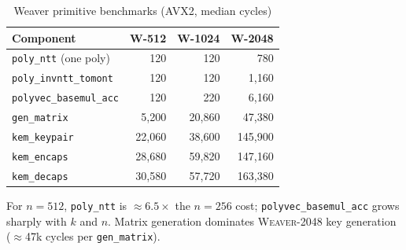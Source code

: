 \begin{table}[t]
\centering
\caption{Weaver primitive benchmarks (AVX2, median cycles)}
\label{tab:weaver_components}
\begin{tabular}{lrrr}
\toprule
\textbf{Component} & \textbf{W-512} & \textbf{W-1024} & \textbf{W-2048} \\
\midrule
\texttt{poly\_ntt} (one poly)       & 120   & 120   & 780 \\
\texttt{poly\_invntt\_tomont}       & 120   & 120   & 1{,}160 \\
\texttt{polyvec\_basemul\_acc}     & 120   & 220   & 6{,}160 \\
\texttt{gen\_matrix}               & 5{,}200 & 20{,}860 & 47{,}380 \\
\texttt{kem\_keypair}              & 22{,}060 & 38{,}600 & 145{,}900 \\
\texttt{kem\_encaps}               & 28{,}680 & 59{,}820 & 147{,}160 \\
\texttt{kem\_decaps}               & 30{,}580 & 57{,}720 & 163{,}380 \\
\bottomrule
\end{tabular}
\end{table}

For $n{=}512$, \texttt{poly\_ntt} is $\approx 6.5\times$ the $n{=}256$ cost; \texttt{polyvec\_basemul\_acc} grows sharply with $k$ and $n$. Matrix generation dominates \textsc{Weaver-2048} key generation ($\approx$47k cycles per \texttt{gen\_matrix}).
